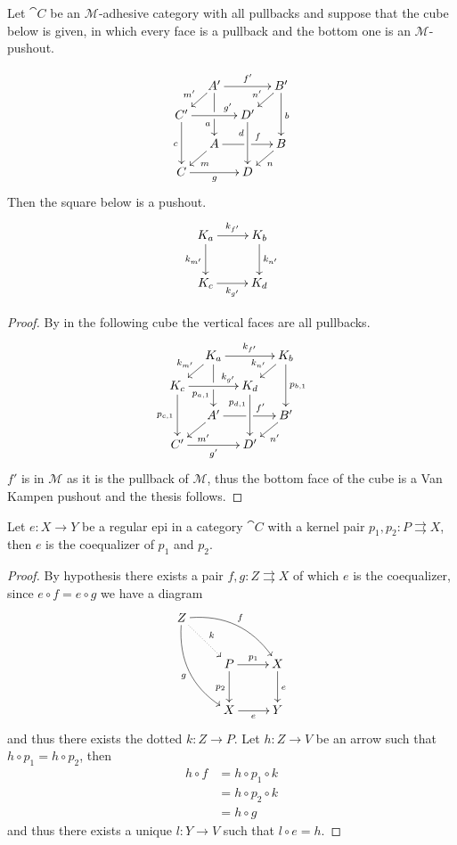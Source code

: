 \begin{lemma}\label{lem:salvavita2}
Let $\cat{C}$ be an $\mathcal{M}$-adhesive category with all pullbacks and suppose that the cube below is given, in which every face is a pullback and the bottom one is an $\mathcal{M}$-pushout.

 	\[\xymatrix@C=10pt@R=10pt{&A'\ar[dd]|\hole_(.65){a}\ar[rr]^{f'} \ar[dl]_{m'} && B' \ar[dd]^{b} \ar[dl]_{n'} \\ C'  \ar[dd]_{c}\ar[rr]^(.7){g'} & & D' \ar[dd]_(.3){d}\\&A\ar[rr]|\hole^(.65){f} \ar[dl]^{m} && B \ar[dl]^{n} \\C \ar[rr]_{g} & & D}\]
Then the square below is a pushout.
\[\xymatrix{K_{a} \ar[r]^{k_{f'}}  \ar[d]_{k_{m'}}& K_b \ar[d]^{k_{n'}}\\ K_c \ar[r]_{k_{g'}} & K_d}\]
\end{lemma}
\begin{proof} By  in the following cube the vertical faces are all pullbacks. 
		\[\xymatrix@C=10pt@R=10pt{&K_a\ar[dd]|\hole_(.65){p_{a,1}}\ar[rr]^{k_{f'}} \ar[dl]_{k_{m'}} && K_b \ar[dd]^{p_{b,1}} \ar[dl]_{k_{n'}} \\ K_c  \ar[dd]_{p_{c,1}}\ar[rr]^(.7){k_{g'}} & & K_d \ar[dd]_(.3){p_{d,1}}\\&A'\ar[rr]|\hole^(.65){f'} \ar[dl]^{m'} && B' \ar[dl]^{n'} \\C' \ar[rr]_{g'} & & D'}\]
	$f'$ is in $\mathcal{M}$ as it is the pullback of $\mathcal{M}$, thus the bottom face of the cube is a Van Kampen pushout and the thesis follows.
\end{proof}


\begin{prop}\label{prop:regepi}
	Let $e\colon X\to Y$ be a regular epi in a category $\cat{C}$ with a kernel pair $p_1, p_2\colon P\rightrightarrows X$, then $e$ is the coequalizer of $p_1$ and $p_2$.
\end{prop}
\begin{proof}
	By hypothesis there exists a pair $f, g\colon Z\rightrightarrows X$ of which $e$ is the coequalizer, since $e\circ f=e\circ g$ we have a diagram
	\[\xymatrix{	Z \ar@/^.5cm/[drr]^{f} \ar@/_.5cm/[ddr]_{g} \ar@{.>}[dr]^{k}& &	\\ &P\ar[r]^{p_1} \ar[d]_{p_2} & X \ar[d]^{e} \\& X \ar[r]_{e}  & Y}\]
	and thus there exists  the dotted $k\colon Z\to P$. Let $h\colon Z\to V$ be an arrow such that $h\circ p_1=h\circ p_2$, then
	\begin{align*}h\circ f &= h \circ p_1\circ k \\&= h \circ p_2\circ k \\&=h\circ g
	\end{align*}
	and thus there exists a unique $l\colon Y\to V$ such that $l\circ e=h$.
\end{proof}


